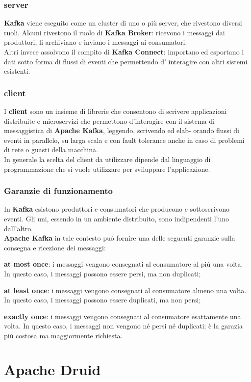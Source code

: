 \subsubsection{server}
\textbf{Kafka} viene eseguito come un cluster di uno o più server, che rivestono diversi ruoli. Alcuni rivestono il ruolo di \textbf{Kafka Broker}: ricevono i messaggi dai produttori, li archiviano e inviano i messaggi ai consumatori.
\\ Altri invece assolvono il compito di \textbf{Kafka Connect}: importano ed esportano i
dati sotto forma di flussi di eventi che permettendo d' interagire con altri sistemi esistenti.
\subsubsection{client}
I \textbf{client} sono un insieme di librerie che consentono di scrivere applicazioni distribuite e microservizi che permettono d'interagire con
il sistema di messaggistica di \textbf{Apache Kafka}, leggendo, scrivendo ed elab-
orando flussi di eventi in parallelo, su larga scala e con \gls{fault tolerance}{} anche in caso di
problemi di rete o guasti della macchina.\\
In generale la scelta del client da utilizzare dipende dal linguaggio di programmazione che si vuole utilizzare per sviluppare l'applicazione.\\ 
\subsubsection{Garanzie di funzionamento}
In \textbf{Kafka} esistono produttori e consumatori che producono e sottoscrivono eventi. Gli uni, essendo in un ambiente distribuito,
sono indipendenti l’uno dall’altro. \\
\textbf{Apache Kafka} in tale contesto può fornire una delle seguenti garanzie sulla consegna e ricezione dei messaggi:
\begin{list}{*}
    \item \textbf{at most once}: i messaggi vengono consegnati al consumatore al più una volta. In questo caso, i messaggi possono essere persi, ma non duplicati;
    \item \textbf{at least once}: i messaggi vengono consegnati al consumatore almeno una volta. In questo caso, i messaggi possono essere duplicati, ma non persi;
    \item \textbf{exactly once}: i messaggi vengono consegnati al consumatore esattamente una volta. In questo caso, i messaggi non vengono né persi né duplicati; è la garazia più costosa ma maggiormente richiesta.
\end{list}



\section{Apache Druid}


\newpage
\pagestyle{empty}
\null %
\newpage